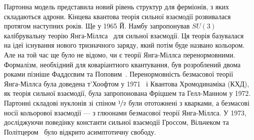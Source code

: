 Партонна модель представила новий рівень структур для ферміонів, з яких складаються адрони. Кінцева квантова теорія сильної взаємодії розвивалася протягом наступних років. Ще у 1965 Й. Намбу запропонував $SU\left(3\right)$ калібрувальну теорію Янга-Міллса~\cite{Yang:1954ek} для сильної взаємодії. Ця теорія базувалася на ідеї існування нового тризначного заряду, який потім буде названо кольором. Але на той час ще було не відомо, чи є теорії Янга-Міллса перенормовними. Формалізм, необхідний для коваріантного квантування, був розроблений двома роками пізніше Фаддєєвим та Поповим~\cite{Faddeev:1967fc}. Перенормовність безмасової теорії Янга-Міллса була  доведена т'Хоофтом у 1971~\cite{tHooft:1971fh} і Квантова Хромодинаміка (КХД), як теорія сильної взаємодії, була запропонована Фріцшем та Гелл-Манном у 1972. Партонні складові нуклонів зі спіном $\nicefrac{1}{2}$ були ототожнені з кварками, а безмасові носії кольорової взаємодії --- з глюонами безмасової теорії Янга-Міллса. У 1973, досліджуючи поведінку константи сильної взаємодії Гроссом, Вільчеком та Політцером~\cite{Gross:1973id,Politzer:1973fx} було відкрито асимптотичну свободу.

